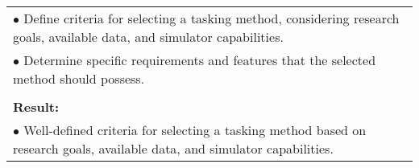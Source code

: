 \begin{table}[!h]
\begin{center}
\begin{tabular}{|p{35mm}||p{55mm}|p{50mm}||p{40mm}|}
      \multicolumn{4}{|p{150mm}|}{$\bullet$ Define criteria for selecting a tasking method, considering research goals, available data, and simulator capabilities.}\\
      \multicolumn{4}{|p{150mm}|}{$\bullet$ Determine specific requirements and features that the selected method should possess.} \\
      \multicolumn{4}{|p{150mm}|}{}                                                                                                                                                                           \\
      \multicolumn{4}{|p{150mm}|}{\textbf{Result:}}                                                                                                                                                       \\
      \multicolumn{4}{|p{150mm}|}{$\bullet$ Well-defined criteria for selecting a tasking method based on research goals, available data, and simulator capabilities.}                                                                                                                          \\                                                                                                                                                             
      \hline                                                                                                                                                                          
    \end{tabular}
  \end{center}
\end{table}

\clearpage



\clearpage

